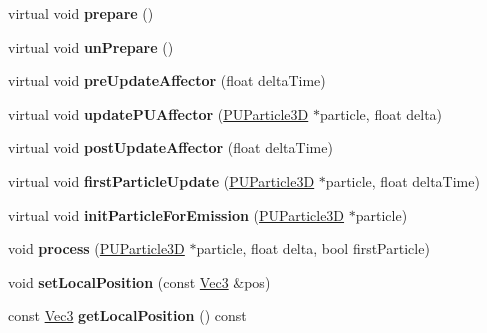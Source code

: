 \begin{DoxyCompactItemize}
\mbox{\label{classPUAffector_ac62bf89d2689cf569c46228fd5c4d0f5}} 
virtual void {\bfseries prepare} ()
\item 
\mbox{\label{classPUAffector_a2dade7fd8d909e5be14e896d88e21ff8}} 
virtual void {\bfseries un\+Prepare} ()
\item 
\mbox{\label{classPUAffector_abbb42d1ee4429d0bc09ff907ac8d0f51}} 
virtual void {\bfseries pre\+Update\+Affector} (float delta\+Time)
\item 
\mbox{\label{classPUAffector_a7178ee1a0aaa759aabdc8e3ee909c258}} 
virtual void {\bfseries update\+P\+U\+Affector} (\hyperlink{structPUParticle3D}{P\+U\+Particle3D} $\ast$particle, float delta)
\item 
\mbox{\label{classPUAffector_a33a5e6902b34c1c0f03a5c64beccee19}} 
virtual void {\bfseries post\+Update\+Affector} (float delta\+Time)
\item 
\mbox{\label{classPUAffector_a37c1aab96233ae639a8fda64ebf6cb41}} 
virtual void {\bfseries first\+Particle\+Update} (\hyperlink{structPUParticle3D}{P\+U\+Particle3D} $\ast$particle, float delta\+Time)
\item 
\mbox{\label{classPUAffector_a8bcfb6284852e1850ffb9e4f447d2403}} 
virtual void {\bfseries init\+Particle\+For\+Emission} (\hyperlink{structPUParticle3D}{P\+U\+Particle3D} $\ast$particle)
\item 
\mbox{\label{classPUAffector_a271c772062f40b7ae17eb660f47bd34c}} 
void {\bfseries process} (\hyperlink{structPUParticle3D}{P\+U\+Particle3D} $\ast$particle, float delta, bool first\+Particle)
\item 
\mbox{\label{classPUAffector_a32e6aaf7374728bd1c65e90f969178a4}} 
void {\bfseries set\+Local\+Position} (const \hyperlink{classVec3}{Vec3} \&pos)
\item 
\mbox{\label{classPUAffector_ad49591d80bfbed0caf3899456b67f233}} 
const \hyperlink{classVec3}{Vec3} {\bfseries get\+Local\+Position} () const
\item 

\end{DoxyCompactItemize}
